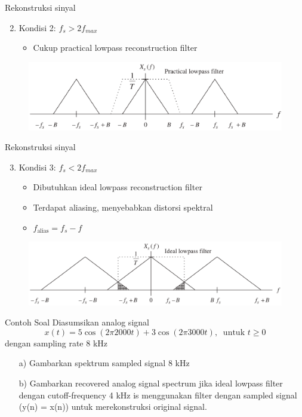 \documentclass[pdflatex,compress,mathserif]{beamer}
\begin{document}
\begin{frame}{Rekonstruksi sinyal}
    \begin{enumerate}
        \setcounter{enumi}{1}
        \item Kondisi 2: $f_s > 2f_{max}$
        \begin{itemize}
            \item Cukup practical lowpass reconstruction filter
        \end{itemize}
    \end{enumerate}
    \begin{figure}
        \includegraphics[width=\linewidth]{img/img16.png}
    \end{figure}
\end{frame}

\begin{frame}{Rekonstruksi sinyal}
    \begin{enumerate}
        \setcounter{enumi}{2}
        \item Kondisi 3: $f_s < 2f_{max}$
        \begin{itemize}
            \item Dibutuhkan ideal lowpass reconstruction filter
            \item Terdapat aliasing, menyebabkan distorsi spektral
            \item $f_\text{alias} = f_s - f$
        \end{itemize}
    \end{enumerate}
    \begin{figure}
        \includegraphics[width=\linewidth]{img/img17.png}
    \end{figure}
\end{frame}

\begin{frame}{Contoh Soal}
    Diasumsikan analog signal $$ x(t) = 5 \cos(2\pi 2000 t) + 3\cos(2\pi 3000t),~\text{ untuk } t \geq 0 $$ dengan sampling rate 8 kHz
    \begin{enumerate}
        \item[a)] Gambarkan spektrum sampled signal 8 kHz
        \item[b)] Gambarkan recovered analog signal spectrum jika ideal lowpass filter dengan cutoff-frequency 4 kHz is menggunakan filter dengan sampled signal (y(n) = x(n)) untuk merekonstruksi original signal.
    \end{enumerate}
\end{frame}
\end{document}
